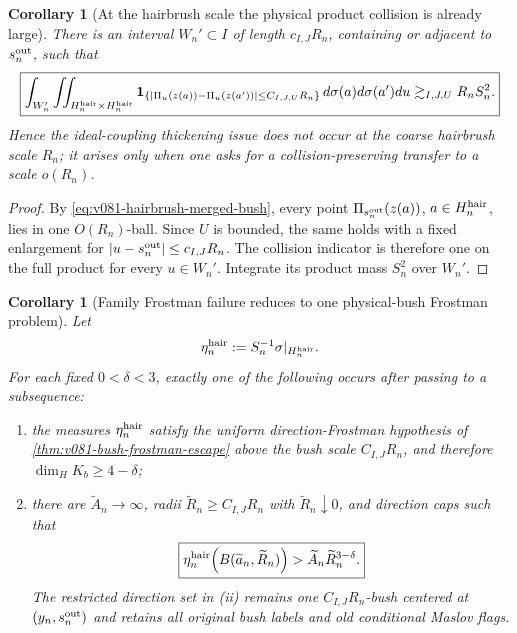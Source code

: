\documentclass[10pt]{article}
\newtheorem{corollary}[theorem]{Corollary}
\begin{document}
\begin{corollary}[At the hairbrush scale the physical product collision is already large]
\label{cor:v081-hairbrush-coarse-product-collision}
There is an interval \(W_n'\subset I\) of length \(c_{I,J}R_n\), containing or adjacent to
\(s_n^{\rm out}\), such that
\begin{equation}
\label{eq:v081-hairbrush-coarse-product-collision}
\boxed{
\int_{W_n'}
\iint_{H_n^{\rm hair}\times H_n^{\rm hair}}
\mathbf 1_{\{|\Pi_u(z(a))-\Pi_u(z(a'))|\le C_{I,J,U}R_n\}}
\,d\sigma(a)d\sigma(a')du
\gtrsim_{I,J,U}
R_nS_n^2.
}
\end{equation}
Hence the ideal-coupling thickening issue does not occur at the coarse hairbrush scale
\(R_n\); it arises only when one asks for a collision-preserving transfer to a scale
\(o(R_n)\).
\end{corollary}

\begin{proof}
By \eqref{eq:v081-hairbrush-merged-bush}, every point
\(\Pi_{s_n^{\rm out}}(z(a))\), \(a\in H_n^{\rm hair}\), lies in one
\(O(R_n)\)-ball.  Since \(U\) is bounded, the same holds with a fixed enlargement for
\(|u-s_n^{\rm out}|\le c_{I,J}R_n\).  The collision indicator is therefore one on the full product
for every \(u\in W_n'\).  Integrate its product mass \(S_n^2\) over \(W_n'\).
\end{proof}

\begin{corollary}[Family Frostman failure reduces to one physical-bush Frostman problem]
\label{cor:v081-family-to-merged-bush-frostman}
Let
\[
\eta_n^{\rm hair}
:=
S_n^{-1}\sigma|_{H_n^{\rm hair}}.
\]
For each fixed \(0<\delta<3\), exactly one of the following occurs after passing to a subsequence:
\begin{enumerate}[label=\textnormal{(\roman*)}]
\item the measures \(\eta_n^{\rm hair}\) satisfy the uniform direction-Frostman hypothesis of
\cref{thm:v081-bush-frostman-escape} above the bush scale \(C_{I,J}R_n\), and therefore
\(\dim_HK_b\ge4-\delta\);
\item there are \(\widetilde A_n\to\infty\), radii
\(\widetilde R_n\ge C_{I,J}R_n\) with \(\widetilde R_n\downarrow0\), and direction caps such that
\begin{equation}
\label{eq:v081-merged-bush-angular-concentration}
\boxed{
\eta_n^{\rm hair}\!\left(B(\widetilde a_n,\widetilde R_n)\right)
>
\widetilde A_n\widetilde R_n^{3-\delta}.
}
\end{equation}
The restricted direction set in \textnormal{(ii)} remains one
\(C_{I,J}R_n\)-bush centered at \((y_n,s_n^{\rm out})\) and retains all original bush labels and
old conditional Maslov flags.
\end{enumerate}
\end{corollary}
\end{document}
